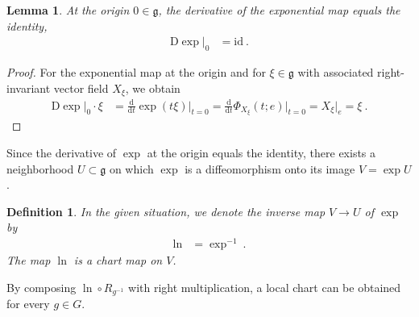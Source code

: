 \documentclass[10pt,a4paper]{article}
\theoremstyle{mytheorem}
\newtheorem{lemma}[theorem]{Lemma}
\theoremstyle{mydefinition}
\newtheorem{definition}[theorem]{Definition}
\newcommand{\dt}{\mathrm{d}}
\newcommand{\Dt}{\mathrm{D}}
\newcommand{\fg}{\mathfrak{g}}
\begin{document}
\begin{lemma}
\label{th:DExp0}
At the origin $0\in\fg$, the derivative of the exponential map equals the identity,
\begin{align*}
	\Dt\exp|_0
	&=
	\mathrm{id}
	\ .
\end{align*}
\end{lemma}
\begin{proof}
For the exponential map at the origin and for $\xi\in\fg$ with associated right-invariant vector field $X_\xi$, we obtain
\begin{align*}
	\Dt\exp|_0 \cdot\xi
	&=
	\frac{\dt}{\dt t}
		\exp(t\xi)
	\Big|_{t=0}
	= \frac{\dt}{\dt t}
		\Phi_{X_{\xi}}(t;e)
	\Big|_{t=0}
	= X_\xi|_e = \xi
	\ .
\end{align*}
\end{proof}

Since the derivative of $\exp$ at the origin equals the identity,
there exists a neighborhood $U\subset\mathfrak{g}$ on which $\exp$ is a diffeomorphism onto its image $V=\exp U$.

\begin{definition}
In the given situation, we denote the inverse map $V\rightarrow U$ of $\exp$ by
\begin{align*}
	\ln &= \exp^{-1}
	\ .
\end{align*}
The map $\ln$ is a chart map on $V$.
\end{definition}
By composing $\ln\circ R_{g^{-1}}$ with right multiplication, a local chart can be obtained for every $g\in G$.
\end{document}
